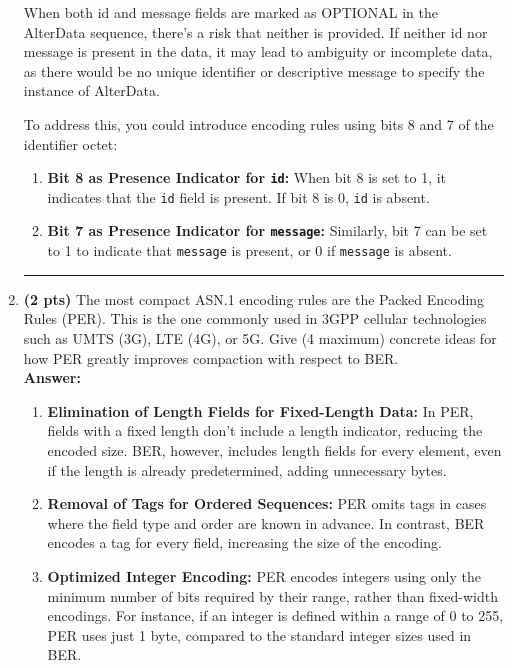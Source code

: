\documentclass[a4paper,10pt]{article}
\begin{document}
\begin{enumerate}[label=\textbf{Question \arabic*.}]
    When both id and message fields are marked as OPTIONAL in the AlterData sequence, there’s a risk that neither is provided. If neither id nor message is present in the data, it may lead to ambiguity or incomplete data, as there would be no unique identifier or descriptive message to specify the instance of AlterData.
    
    To address this, you could introduce encoding rules using bits 8 and 7 of the identifier octet:

    \begin{enumerate}[label=\text{-}]
        \item \textbf{Bit 8 as Presence Indicator for \texttt{id}:} When bit 8 is set to 1, it indicates that the \texttt{id} field is present. If bit 8 is 0, \texttt{id} is absent.
        \item \textbf{Bit 7 as Presence Indicator for \texttt{message}:} Similarly, bit 7 can be set to 1 to indicate that \texttt{message} is present, or 0 if \texttt{message} is absent.
    \end{enumerate}

    \noindent\rule{\textwidth}{0.4mm}

    \item \textbf{(2 pts)} The most compact ASN.1 encoding rules are the Packed Encoding Rules (PER). This is the one
    commonly used in 3GPP cellular technologies such as UMTS (3G), LTE (4G), or 5G.
    Give (4 maximum) concrete ideas for how PER greatly improves compaction with respect to BER. \\

    \textbf{Answer:}
    \begin{enumerate}
        \item \textbf{Elimination of Length Fields for Fixed-Length Data:} In PER, fields with a fixed length don’t include a length indicator, reducing the encoded size. BER, however, includes length fields for every element, even if the length is already predetermined, adding unnecessary bytes.
        
        \item \textbf{Removal of Tags for Ordered Sequences:} PER omits tags in cases where the field type and order are known in advance. In contrast, BER encodes a tag for every field, increasing the size of the encoding.
        
        \item \textbf{Optimized Integer Encoding:} PER encodes integers using only the minimum number of bits required by their range, rather than fixed-width encodings. For instance, if an integer is defined within a range of 0 to 255, PER uses just 1 byte, compared to the standard integer sizes used in BER.
        

\end{enumerate}
\end{enumerate}
\end{document}
